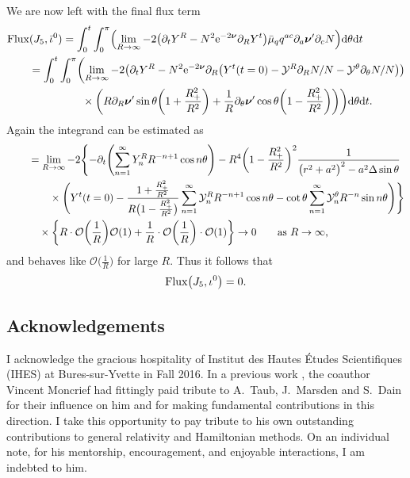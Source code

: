 \documentclass[pdftex]{sigma}
\def\ptl{\partial}%
\def\mbo#1{\boldsymbol{#1}}%
\numberwithin{equation}{section}
\begin{document}
We are now left with the final flux term
\begin{align*}
&{\rm Flux} (J_5, \bar{\iota}^0) = \int^t_0 \int^\pi_0 \Bigl(\lim_{R \to \infty} -2\bigl(\ptl_t Y^R - N^2 {\rm e}^{-2 \mbo{\nu}} \ptl_R Y^t\bigr) \bar{\mu}_q q^{ac} \ptl_a \mbo{\nu}' \ptl_c N \Bigr) {\rm d}\theta {\rm d}t \notag\\
&\qquad{} = \int^t_0 \int^\pi_0 \biggl(\lim_{R \to \infty} -2 \bigl(\ptl_t Y^R - N^2 {\rm e}^{-2 \mbo{\nu}} \ptl_R \bigl(Y^t (t=0) - \mathcal Y^R \ptl_R N/N -\mathcal{Y}^\theta \ptl_\theta N/N\bigr) \bigr) \notag\\
& \qquad\hphantom{= \int^t_0 \int^\pi_0 \biggl(}{} \times\biggl(R \ptl_R \mbo{\nu}' \sin \theta \biggl(1+ \frac{R^2_+}{R^2}\biggr) + \frac{1}{R} \ptl_ \theta \mbo{\nu}' \cos \theta \biggl(1- \frac{R^2_+}{R^2}\biggr) \biggr) \biggr) {\rm d}\theta {\rm d}t.
\end{align*}
Again the integrand can be estimated as
\begin{align*}
\qquad&{}= \lim_{R \to \infty} -2 \Biggl\{- \ptl_t \Biggl(\sum^{\infty}_{n=1} Y^R_n R^{-n+1} \cos n \theta \Biggr) - R^4 \biggl(1- \frac{R^2_+}{R^2}\biggr)^2 \frac{1}{ \bigl(r^2 +a^2\bigr)^2 - a^2 \Delta \sin \theta} \notag\\
& \qquad{}
\times \Biggl(Y^t(t=0)- \frac{1+ \frac{R^2_+}{R^2}}{R \bigl(1- \frac{R_+^2}{R^2}\bigr)} \sum^{\infty}_{n=1} \mathcal{Y}^R_n R^{-n+1} \cos n \theta - \cot \theta \sum^\infty_{n=1} \mathcal{Y}^\theta_n R^{-n} \sin n\theta \Biggr) \Biggr\} \notag\\
& \quad{}\times \biggl\{ R \cdot \mathcal{O} \biggl(\frac{1}{R}\biggr) \mathcal{O}(1) + \frac{1}{R} \cdot \mathcal{O}\biggl(\frac{1}{R}\biggr) \cdot \mathcal{O}(1) \biggr\} \to 0 \qquad \text{as} \ R \to \infty,
\end{align*}
and behaves like $\mathcal{O}\bigl(\frac{1}{R}\bigr)$ for large $R$.
Thus it follows that
\begin{align*}
{\rm Flux}\bigl(J_5, \iota^0\bigr) = 0.
\end{align*}

\subsection*{Acknowledgements}
I acknowledge the gracious hospitality of Institut des Hautes \'Etudes Scientifiques (IHES) at Bures-sur-Yvette in Fall 2016.
In a previous work \cite{GM17_gentitle}, the coauthor Vincent Moncrief had fittingly paid tribute to A.~Taub, J.~Marsden and S.~Dain for their influence on him and for making fundamental contributions in this direction. I take this opportunity to pay tribute to his own outstanding contributions to general relativity and Hamiltonian methods. On an individual note, for his mentorship, encouragement, and enjoyable interactions, I am indebted to him.
\end{document}
